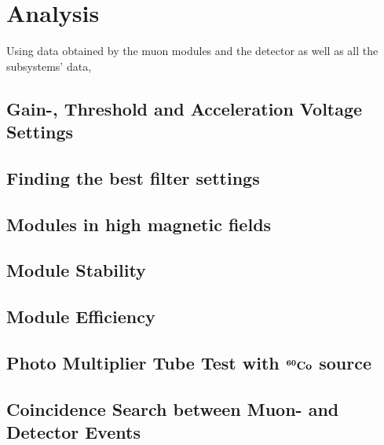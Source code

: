 %

\chapter{Analysis}
\label{ch:Analysis}
  Using data obtained by the muon modules and the detector as well as all the subsystems' data, 

  \section{Gain-, Threshold and Acceleration Voltage Settings}
  \label{ch:Analysis software:sec:Module Stability}
  
  \section{Finding the best filter settings}
  \label{ch:Analysis software:sec:Finding the best filter settings}
  
  \section{Modules in high magnetic fields}
  \label{ch:Analysis software:sec:Modules in high magnetic fields}
  
  \section{Module Stability}
  \label{ch:Analysis software:sec:Module Stability}

  \section{Module Efficiency}
  \label{ch:Analysis software:sec:Module Efficiency}
  
  \section{Photo Multiplier Tube Test with $\bf{^{60}Co}$ source}
  \label{ch:Analysis:sec:}
  
  \section{Coincidence Search between Muon- and Detector Events}
  \label{ch:Analysis software:sec:Monitor Spectrometer Measurements}
  
  
  
